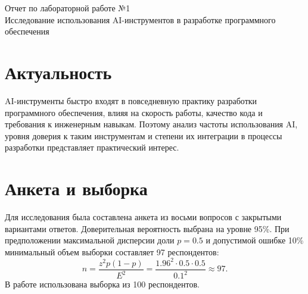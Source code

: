 \documentclass[12pt]{article}
\begin{document}
\begin{center}
{\Large Отчет по лабораторной работе №1}\\
Исследование использования AI-инструментов в разработке программного обеспечения
\end{center}

\section*{Актуальность}
AI-инструменты быстро входят в повседневную практику разработки программного обеспечения, влияя на скорость работы, качество кода и требования к инженерным навыкам. Поэтому анализ частоты использования AI, уровня доверия к таким инструментам и степени их интеграции в процессы разработки представляет практический интерес.

\section*{Анкета и выборка}
Для исследования была составлена анкета из восьми вопросов с закрытыми вариантами ответов. Доверительная вероятность выбрана на уровне 95\%. При предположении максимальной дисперсии доли $p=0.5$ и допустимой ошибке 10\% минимальный объем выборки составляет 97 респондентов:
\[
n = \frac{z^2 p (1-p)}{E^2} = \frac{1.96^2 \cdot 0.5 \cdot 0.5}{0.1^2} \approx 97.
\]
В работе использована выборка из 100 респондентов.
\end{document}

